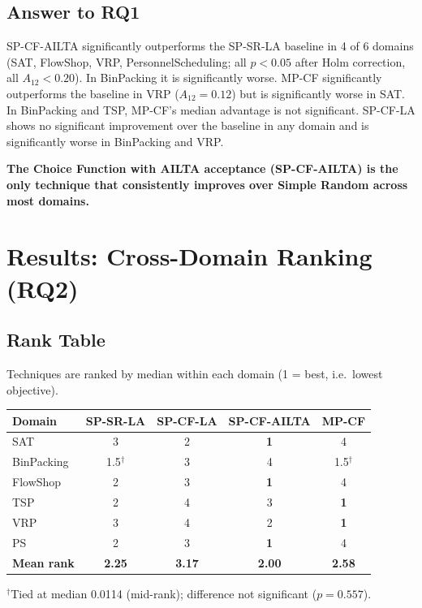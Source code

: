\documentclass[11pt,a4paper]{article}
\begin{document}
\subsection{Answer to RQ1}

SP-CF-AILTA significantly outperforms the SP-SR-LA baseline in 4 of 6 domains
(SAT, FlowShop, VRP, PersonnelScheduling; all $p < 0.05$ after Holm correction,
all $A_{12} < 0.20$). In BinPacking it is significantly worse. MP-CF significantly
outperforms the baseline in VRP ($A_{12} = 0.12$) but is significantly worse in SAT.
In BinPacking and TSP, MP-CF's median advantage is not significant.
SP-CF-LA shows no significant improvement over the baseline in any domain and is
significantly worse in BinPacking and VRP.

\textbf{The Choice Function with AILTA acceptance (SP-CF-AILTA) is the only technique
that consistently improves over Simple Random across most domains.}

\section{Results: Cross-Domain Ranking (RQ2)}

\subsection{Rank Table}

Techniques are ranked by median within each domain (1 = best, i.e.\ lowest objective).

\begin{table}[H]
\centering
\begin{tabular}{lcccc}
\toprule
Domain & SP-SR-LA & SP-CF-LA & SP-CF-AILTA & MP-CF \\
\midrule
SAT & 3 & 2 & \textbf{1} & 4 \\
BinPacking & 1.5$^\dagger$ & 3 & 4 & 1.5$^\dagger$ \\
FlowShop & 2 & 3 & \textbf{1} & 4 \\
TSP & 2 & 4 & 3 & \textbf{1} \\
VRP & 3 & 4 & 2 & \textbf{1} \\
PS & 2 & 3 & \textbf{1} & 4 \\
\midrule
\textbf{Mean rank} & \textbf{2.25} & \textbf{3.17} & \textbf{2.00} & \textbf{2.58} \\
\bottomrule
\end{tabular}
\end{table}

$^\dagger$Tied at median 0.0114 (mid-rank); difference not significant ($p = 0.557$).
\end{document}
